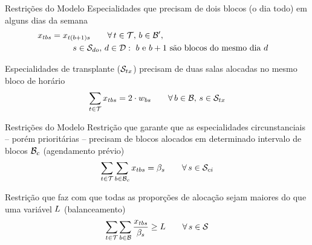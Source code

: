 \documentclass[10pt]{beamer}
\begin{document}
\begin{frame}{Restrições do Modelo}
    Especialidades que precisam de dois blocos (o dia todo) em alguns dias da semana
    \begin{align}
    \label{eq:m2-10}
        &x_{tbs} = x_{t(b+1)s} \hspace{2em} \forall\, t \in \mathcal{T},\, b \in \mathcal{B'},&\\
        &\hspace{4em}\,s \in \mathcal{S}_{do},\, d \in \mathcal{D} : \text{ $b$ e $b+1$ são blocos do mesmo dia $d$}&\nonumber
    \end{align}
    \vspace{2em}

    Especialidades de transplante ($\mathcal{S}_{tx}$) precisam de duas salas alocadas no mesmo bloco de horário
    \begin{equation}
    \label{eq:m2-11}
        \sum_{t \in \mathcal{T}} x_{tbs} = 2 \cdot w_{bs} \hspace{2em} \forall\, b \in \mathcal{B},\, s \in \mathcal{S}_{tx}
    \end{equation}
\end{frame}


\begin{frame}{Restrições do Modelo}
    Restrição que garante que as especialidades circunstanciais -- porém prioritárias -- precisam de blocos alocados em determinado intervalo de blocos $\mathcal{B}_{c}$ (agendamento prévio)
    \begin{equation}
    \label{eq:m2-12}
        \sum_{t \in \mathcal{T}} \sum_{b \in \mathcal{B}_{c}} x_{tbs} = \beta_{s} \hspace{2em} \forall\, s \in \mathcal{S}_{ci}
    \end{equation}
    \vspace{2em}

    Restrição que faz com que todas as proporções de alocação sejam maiores do que uma variável $L$ (balanceamento)
    \begin{equation}
    \label{eq:m2-13}
         \sum_{t \in \mathcal{T}} \sum_{b \in \mathcal{B}} \frac{x_{tbs}}{\beta_{s}} \geq L \hspace{2em} \forall\, s \in \mathcal{S}
    \end{equation}
\end{frame}
\end{document}
